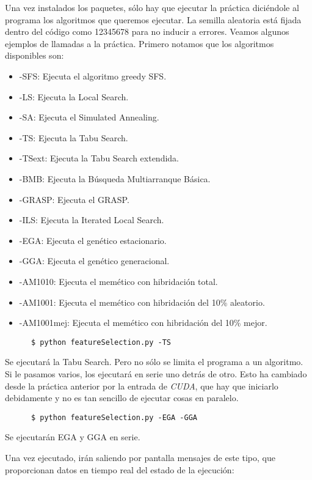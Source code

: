 \documentclass[a4paper, 11pt]{article}
\begin{document}
    Una vez instalados los paquetes, sólo hay que ejecutar la práctica diciéndole al programa los algoritmos que queremos ejecutar. La semilla aleatoria está fijada dentro del código como 12345678 para no inducir a errores. Veamos algunos ejemplos de llamadas a la práctica. Primero notamos que los algoritmos disponibles son:

    \begin{itemize}
      \item -SFS: Ejecuta el algoritmo greedy SFS.
      \item -LS: Ejecuta la Local Search.
      \item -SA: Ejecuta el Simulated Annealing.
      \item -TS: Ejecuta la Tabu Search.
      \item -TSext: Ejecuta la Tabu Search extendida.
      \item -BMB: Ejecuta la Búsqueda Multiarranque Básica.
      \item -GRASP: Ejecuta el GRASP.
      \item -ILS: Ejecuta la Iterated Local Search.
      \item -EGA: Ejecuta el genético estacionario.
      \item -GGA: Ejecuta el genético generacional.
      \item -AM1010: Ejecuta el memético con hibridación total.
      \item -AM1001: Ejecuta el memético con hibridación del 10\% aleatorio.
      \item -AM1001mej: Ejecuta el memético con hibridación del 10\% mejor.
    \end{itemize}

    \begin{verbatim}
      $ python featureSelection.py -TS
    \end{verbatim}
    Se ejecutará la Tabu Search. Pero no sólo se limita el programa a un algoritmo. Si le pasamos varios, los ejecutará en serie uno detrás de otro. Esto ha cambiado desde la práctica anterior por la entrada de \emph{CUDA}, que hay que iniciarlo debidamente y no es tan sencillo de ejecutar cosas en paralelo.

    \begin{verbatim}
      $ python featureSelection.py -EGA -GGA
    \end{verbatim}
    Se ejecutarán EGA y GGA en serie.

    Una vez ejecutado, irán saliendo por pantalla mensajes de este tipo, que proporcionan datos en tiempo real del estado de la ejecución:
\end{document}
